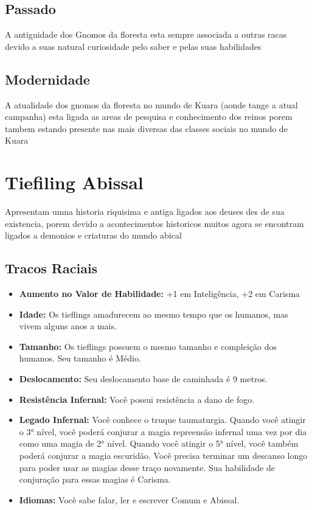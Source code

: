\documentclass{book}
\begin{document}
\section{Passado}
A antiguidade dos Gnomos da floresta esta sempre associada a outras racas devido a suas 
natural curiosidade pelo saber e pelas suas habilidades 
\section{Modernidade}
A atualidade dos gnomos da floresta no mundo de Kuara (aonde tange a atual campanha) esta
ligada as areas de pesquisa e conhecimento dos reinos porem tambem estando presente nas 
mais diversas das classes sociais no mundo de Kuara 

\chapter{Tiefiling Abissal}
Apresentam umna historia riquisima e antiga ligados aos deuses des de sua existencia, porem 
devido a acontecimentos historicos muitos agora se encontram ligados a demonios e criaturas 
do mundo abical 
\section{Tracos Raciais}
\begin{itemize}
    \item \textbf{Aumento no Valor de Habilidade:} +1 em Inteligência, +2 em Carisma
    \item \textbf{Idade:} Os tieflings amadurecem ao mesmo tempo que os humanos, mas vivem 
          alguns anos a mais.
    \item \textbf{Tamanho:} Os tieflings possuem o mesmo tamanho e compleição dos humanos. 
          Seu tamanho é Médio.
    \item \textbf{Deslocamento:} Seu deslocamento base de caminhada é 9 metros.
      \item \textbf{Resistência Infernal:} Você possui resistência a dano de fogo.
    \item \textbf{Legado Infernal:} Você conhece o truque taumaturgia. Quando você atingir o
          3° nível, você poderá conjurar a magia repreensão infernal uma vez por dia
          como uma magia de 2° nível. Quando você atingir o 5° nível, você também poderá 
          conjurar a magia escuridão. Você precisa terminar um descanso longo para poder usar
          as magias desse traço novamente. Sua habilidade de conjuração para essas magias é 
          Carisma.
    \item \textbf{Idiomas:} Você sabe falar, ler e escrever Comum e Abissal.
\end{itemize}
\end{document}
